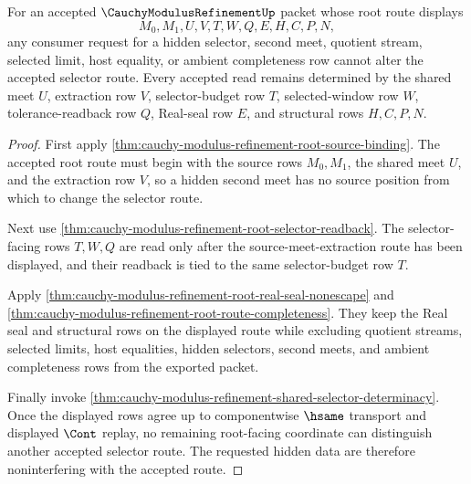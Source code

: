 \begin{theorem}
\label{thm:cauchy-modulus-refinement-selector-meet-noninterference}
For an accepted $\CauchyModulusRefinementUp$ packet whose root route displays
$$
M_0,M_1,U,V,T,W,Q,E,H,C,P,N,
$$
any consumer request for a hidden selector, second meet, quotient stream,
selected limit, host equality, or ambient completeness row cannot alter the
accepted selector route. Every accepted read remains determined by the shared
meet $U$, extraction row $V$, selector-budget row $T$, selected-window row
$W$, tolerance-readback row $Q$, Real-seal row $E$, and structural rows
$H,C,P,N$.
\end{theorem}
\begin{proof}
First apply \autoref{thm:cauchy-modulus-refinement-root-source-binding}. The
accepted root route must begin with the source rows $M_0,M_1$, the shared meet
$U$, and the extraction row $V$, so a hidden second meet has no source position
from which to change the selector route.

Next use \autoref{thm:cauchy-modulus-refinement-root-selector-readback}. The
selector-facing rows $T,W,Q$ are read only after the source-meet-extraction
route has been displayed, and their readback is tied to the same
selector-budget row $T$.

Apply \autoref{thm:cauchy-modulus-refinement-root-real-seal-nonescape} and
\autoref{thm:cauchy-modulus-refinement-root-route-completeness}. They keep the
Real seal and structural rows on the displayed route while excluding quotient
streams, selected limits, host equalities, hidden selectors, second meets, and
ambient completeness rows from the exported packet.

Finally invoke \autoref{thm:cauchy-modulus-refinement-shared-selector-determinacy}.
Once the displayed rows agree up to componentwise $\hsame$ transport and
displayed $\Cont$ replay, no remaining root-facing coordinate can distinguish
another accepted selector route. The requested hidden data are therefore
noninterfering with the accepted route.
\end{proof}

